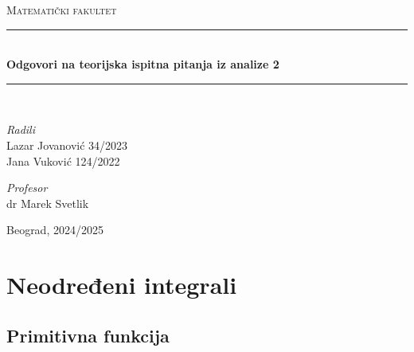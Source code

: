 \documentclass{article}
\begin{document}
\begin{titlepage}

    \newcommand{\HRule}{\rule{\linewidth}{0.4mm}}
    \center
    \textsc{\LARGE Matematički fakultet}\\[7cm]

    \HRule\\[0.4cm]
    {\LARGE\bfseries Odgovori na teorijska ispitna pitanja iz analize 2}
    \\[0.2cm]
    \HRule\\[2cm]

    \vspace{20\baselineskip}
    \begin{minipage}[t]{0.4\textwidth}
        \begin{flushleft}
            \large
            \textit{Radili}\\
            Lazar Jovanović 34/2023\\
            Jana Vuković 124/2022
        \end{flushleft}
    \end{minipage}
    \hspace*{1cm}
    \begin{minipage}[t]{0.4\textwidth}
        \begin{flushright}
            \large
            \textit{Profesor}\\
            dr Marek Svetlik
        \end{flushright}
    \end{minipage}

    \vfill\vfill\vfill\vfill
    {\large Beograd, 2024/2025}
    \vfill

\end{titlepage}

\renewcommand{\contentsname}{Sadržaj}
\tableofcontents

\newpage

\section{Neodređeni integrali}
\subsection{Primitivna funkcija}
\end{document}
